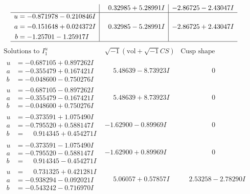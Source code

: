 \documentclass[1p]{elsarticle_modified}
\theoremstyle{definition}
\newcommand{\I}{\sqrt{-1}}
\begin{document}
$$\begin{array}{c|c|c}
 & \phantom{-}0.32985 + 5.28991 I & -2.86725 - 2.43047 I \\ \hline\begin{aligned}
u &= -0.871978 - 0.210846 I \\
a &= -0.151648 + 0.024372 I \\
b &= -1.25701 - 1.25917 I\end{aligned}
 & \phantom{-}0.32985 - 5.28991 I & -2.86725 + 2.43047 I\\
 \hline 
 \end{array}$$\newpage$$\begin{array}{c|c|c}  
\text{Solutions to }I^u_{1}& \I (\text{vol} + \sqrt{-1}CS) & \text{Cusp shape}\\
 \hline 
\begin{aligned}
u &= -0.687105 + 0.897262 I \\
a &= -0.355479 + 0.167421 I \\
b &= -0.048600 - 0.750276 I\end{aligned}
 & \phantom{-}5.48639 - 8.73923 I & \phantom{-0.000000 } 0 \\ \hline\begin{aligned}
u &= -0.687105 - 0.897262 I \\
a &= -0.355479 - 0.167421 I \\
b &= -0.048600 + 0.750276 I\end{aligned}
 & \phantom{-}5.48639 + 8.73923 I & \phantom{-0.000000 } 0 \\ \hline\begin{aligned}
u &= -0.373591 + 1.075490 I \\
a &= -0.795520 + 0.588147 I \\
b &= \phantom{-}0.914345 + 0.454271 I\end{aligned}
 & -1.62900 - 0.89969 I & \phantom{-0.000000 } 0 \\ \hline\begin{aligned}
u &= -0.373591 - 1.075490 I \\
a &= -0.795520 - 0.588147 I \\
b &= \phantom{-}0.914345 - 0.454271 I\end{aligned}
 & -1.62900 + 0.89969 I & \phantom{-0.000000 } 0 \\ \hline\begin{aligned}
u &= \phantom{-}0.731325 + 0.421281 I \\
a &= -0.938294 - 0.092021 I \\
b &= -0.543242 - 0.716970 I\end{aligned}
 & \phantom{-}5.06057 + 0.57857 I & \phantom{-}2.53258 - 2.78290 I \\ \hline\begin{aligned}

\end{aligned}
\end{array}$$
\end{document}
